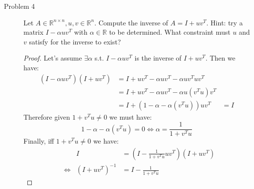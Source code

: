 \documentclass{article}
\begin{document}
\begin{description}
	\item[Problem 4] Let $A \in \mathbb{R}^{n\times n}, \textit{u}, \textit{v} \in \mathbb{R}^n$. Compute the inverse of $A = I + \textit{u}\textit{v}^T$.
	      Hint:
	      try a matrix $I - \alpha \textit{u} \textit{v}^T$ with $\alpha \in \mathbb{R}$ to be determined.
	      What constraint must $\textit{u}$ and $\textit{v}$ satisfy for the inverse to exist?
	      \begin{proof}
		      Let's assume $\exists \alpha$ s.t. $I - \alpha \textit{u} \textit{v}^T$ is the inverse of $I + \textit{u}\textit{v}^T$.
		      Then we have:
		      \begin{align*}
			      (I - \alpha \textit{u} \textit{v}^T)(I + \textit{u}\textit{v}^T)
			       & = I + \textit{u}\textit{v}^T - \alpha \textit{u} \textit{v}^T - \alpha \textit{u} \textit{v}^T\textit{u}\textit{v}^T  &     \\
			       & = I + \textit{u}\textit{v}^T - \alpha \textit{u} \textit{v}^T - \alpha \textit{u}(\textit{v}^T\textit{u})\textit{v}^T &     \\
			       & = I + (1 - \alpha - \alpha(\textit{v}^T\textit{u}))\textit{u}\textit{v}^T                                             & = I
		      \end{align*}
		      Therefore given $1 + \textit{v}^T\textit{u} \ne 0$ we must have:
		      $$
			      1 - \alpha - \alpha(\textit{v}^T\textit{u})  = 0
			      \Leftrightarrow \alpha                                       = \frac{1}{1 + \textit{v}^T\textit{u}}
		      $$
		      Finally, iff $1 + \textit{v}^T\textit{u} \ne 0$ we have:
		      \begin{align*}
			       &                 & I                                 & = (I - \frac{1}{1 + \textit{v}^T\textit{u}} \textit{u} \textit{v}^T)(I + \textit{u}\textit{v}^T) \\
			       & \Leftrightarrow & (I + \textit{u}\textit{v}^T)^{-1} & = I - \frac{1}{1 + \textit{v}^T\textit{u}}
		      \end{align*}

	      \end{proof}



\end{description}
\end{document}
